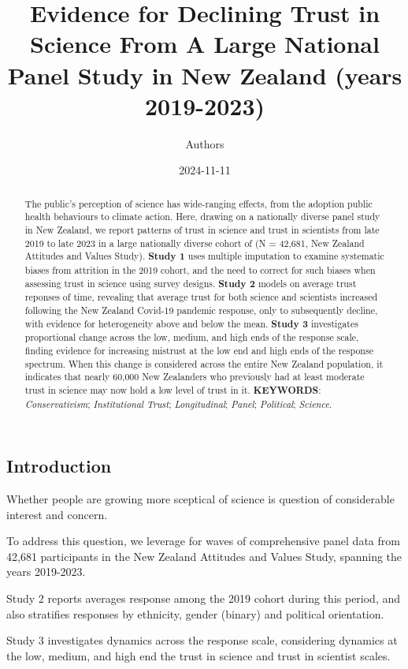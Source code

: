 \documentclass[
  single column]{article}
\title{Evidence for Declining Trust in Science From A Large National
Panel Study in New Zealand (years 2019-2023)}
\author{Authors}
\affil{%
             \small{     New Zealand
          ORCID \textcolor[HTML]{A6CE39}{\aiOrcid} ~0000-0003-3169-6576 }
              }
\date{2024-11-11}
\begin{document}
\maketitle
\begin{abstract}
The public's perception of science has wide-ranging effects, from the
adoption public health behaviours to climate action. Here, drawing on a
nationally diverse panel study in New Zealand, we report patterns of
trust in science and trust in scientists from late 2019 to late 2023 in
a large nationally diverse cohort of (N = 42,681, New Zealand Attitudes
and Values Study). \textbf{Study 1} uses multiple imputation to examine
systematic biases from attrition in the 2019 cohort, and the need to
correct for such biases when assessing trust in science using survey
designs. \textbf{Study 2} models on average trust reponses of time,
revealing that average trust for both science and scientists increased
following the New Zealand Covid-19 pandemic response, only to
subsequently decline, with evidence for heterogeneity above and below
the mean. \textbf{Study 3} investigates proportional change across the
low, medium, and high ends of the response scale, finding evidence for
increasing mistrust at the low end and high ends of the response
spectrum. When this change is considered across the entire New Zealand
population, it indicates that nearly 60,000 New Zealanders who
previously had at least moderate trust in science may now hold a low
level of trust in it. \textbf{KEYWORDS}: \emph{Conservativism};
\emph{Institutional Trust}; \emph{Longitudinal}; \emph{Panel};
\emph{Political}; \emph{Science}.
\end{abstract}


\subsection{Introduction}\label{introduction}

Whether people are growing more sceptical of science is question of
considerable interest and concern.

To address this question, we leverage for waves of comprehensive panel
data from 42,681 participants in the New Zealand Attitudes and Values
Study, spanning the years 2019-2023.

Study 2 reports averages response among the 2019 cohort during this
period, and also stratifies responses by ethnicity, gender (binary) and
political orientation.

Study 3 investigates dynamics across the response scale, considering
dynamics at the low, medium, and high end the trust in science and trust
in scientist scales.
\end{document}
